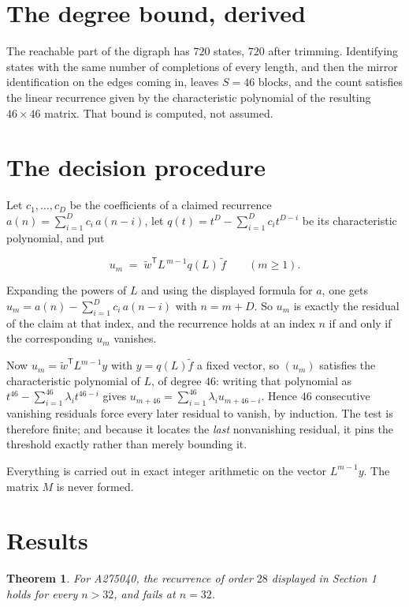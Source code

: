 \documentclass[11pt]{article}
\newtheorem{theorem}{Theorem}
\theoremstyle{definition}
\begin{document}
\section{The degree bound, derived}

The reachable part of the digraph has $720$ states, $720$ after trimming. Identifying states with the same number of completions of every length, and then the mirror identification on the edges coming in, leaves $S = 46$ blocks, and the count satisfies the linear recurrence given by the characteristic polynomial of the resulting $46\times46$ matrix. That bound is computed, not assumed.

\section{The decision procedure}

Let $c_1,\dots,c_D$ be the coefficients of a claimed recurrence $a(n) = \sum_{i=1}^{D} c_i\,a(n-i)$, let $q(t) = t^{D} - \sum_{i=1}^{D} c_i t^{D-i}$ be its characteristic polynomial, and put

\[u_m \;=\; \tilde w^{\mathsf T} L^{\,m-1} q(L)\,\tilde f \qquad (m \ge 1).\]

Expanding the powers of $L$ and using the displayed formula for $a$, one gets $u_m = a(n) - \sum_{i=1}^{D} c_i\,a(n-i)$ with $n = m + D$. So $u_m$ is exactly the residual of the claim at that index, and the recurrence holds at an index $n$ if and only if the corresponding $u_m$ vanishes.

Now $u_m = \tilde w^{\mathsf T} L^{m-1} y$ with $y = q(L)\tilde f$ a fixed vector, so $(u_m)$ satisfies the characteristic polynomial of $L$, of degree $46$: writing that polynomial as $t^{46} - \sum_{i=1}^{46} \lambda_i t^{46-i}$ gives $u_{m+46} = \sum_{i=1}^{46} \lambda_i u_{m+46-i}$. Hence $46$ consecutive vanishing residuals force every later residual to vanish, by induction. The test is therefore finite; and because it locates the {\itshape last} nonvanishing residual, it pins the threshold exactly rather than merely bounding it.

Everything is carried out in exact integer arithmetic on the vector $L^{m-1}y$. The matrix $M$ is never formed.

\section{Results}

\begin{theorem} For A275040, the recurrence of order $28$ displayed in Section 1 holds for every $n > 32$, and fails at $n = 32$.\end{theorem}
\end{document}
